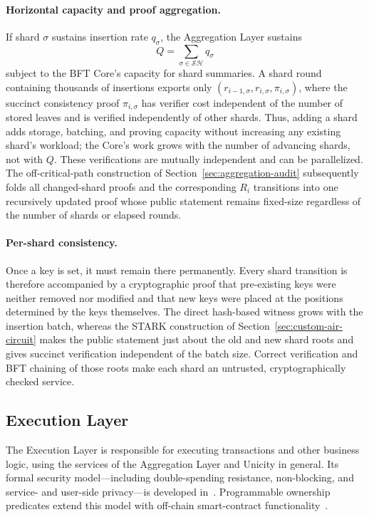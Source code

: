 \documentclass[twocolumn]{article}
\begin{document}
\paragraph{Horizontal capacity and proof aggregation.}
If shard $\sigma$ sustains insertion rate $q_\sigma$, the Aggregation Layer sustains
\[
    Q=\sum_{\sigma\in\mathcal{SH}} q_\sigma
\]
subject to the BFT Core's capacity for shard summaries. A shard round containing thousands of insertions exports only $(r_{i-1,\sigma},r_{i,\sigma},\pi_{i,\sigma})$, where the succinct consistency proof $\pi_{i,\sigma}$ has verifier cost independent of the number of stored leaves and is verified independently of other shards. Thus, adding a shard adds storage, batching, and proving capacity without increasing any existing shard's workload; the Core's work grows with the number of advancing shards, not with $Q$. These verifications are mutually independent and can be parallelized. The off-critical-path construction of Section~\ref{sec:aggregation-audit} subsequently folds all changed-shard proofs and the corresponding $R_i$ transitions into one recursively updated proof whose public statement remains fixed-size regardless of the number of shards or elapsed rounds.

\paragraph{Per-shard consistency.}
Once a key is set, it must remain there permanently. Every shard transition is therefore accompanied by a cryptographic proof that pre-existing keys were neither removed nor modified and that new keys were placed at the positions determined by the keys themselves. The direct hash-based witness grows with the insertion batch, whereas the STARK construction of Section~\ref{sec:custom-air-circuit} makes the public statement just about the old and new shard roots and gives succinct verification independent of the batch size. Correct verification and BFT chaining of those roots make each shard an untrusted, cryptographically checked service.


\subsection{Execution Layer}

The Execution Layer is responsible for executing transactions and other business logic, using the services of the Aggregation Layer and Unicity in general. Its formal security model---including double-spending resistance, non-blocking, and service- and user-side privacy---is developed in~\cite{exemodel}. Programmable ownership predicates extend this model with off-chain smart-contract functionality~\cite{predicates}.
\end{document}
